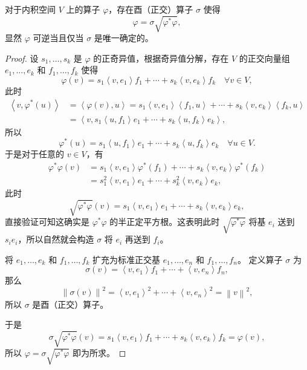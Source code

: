 \documentclass[fontset=none,zihao=-4]{Notes}
\newcommand{\inn}[1]{\left\langle#1\right\rangle}
\newcommand{\norm}[1]{\left\lVert#1\right\rVert}
\begin{document}
\begin{theorem}[线性映射的极分解]\label{thm:polar decoposition of map}
  对于内积空间 $V$ 上的算子 $\varphi$，存在酉（正交）算子 $\sigma$ 使得
  \[
    \varphi=\sigma\sqrt{\varphi^*\varphi},  
  \]
  显然 $\varphi$ 可逆当且仅当 $\sigma$ 是唯一确定的。
\end{theorem}
\begin{proof}
  设 $s_1,\dots,s_k$ 是 $\varphi$ 的正奇异值，根据奇异值分解，存在
  $V$ 的正交向量组 $e_1,\dots,e_k$ 和 $f_1,\dots,f_k$ 使得
  \[
    \varphi(v)=s_1\inn{v,e_1}f_1+\cdots+s_k\inn{v,e_k}f_k\quad \forall v\in V,  
  \]
  此时
  \begin{align*}
    \inn{v,\varphi^*(u)}&=\inn{\varphi(v),u}=
    s_1\inn{v,e_1}\inn{f_1,u}+\cdots+s_k\inn{v,e_k}\inn{f_k,u}\\
    &= \inn{v,s_1\inn{u,f_1}e_1+\cdots+s_k\inn{u,f_k}e_k},
  \end{align*}
  所以
  \[
    \varphi^*(u)=  s_1\inn{u,f_1}e_1+\cdots+s_k\inn{u,f_k}e_k\quad \forall u\in V.
  \]
  于是对于任意的 $v\in V$，有
  \begin{align*}
    \varphi^*\varphi(v)&=s_1\inn{v,e_1}\varphi^*(f_1)+\cdots+s_k\inn{v,e_k}\varphi^*(f_k)\\
    &=s_1^2\inn{v,e_1}e_1+\cdots+s_k^2\inn{v,e_k}e_k,
  \end{align*}
  此时
  \[
    \sqrt{\varphi^*\varphi}(v)=s_1\inn{v,e_1}e_1+\cdots+s_k\inn{v,e_k}e_k,
  \]
  直接验证可知这确实是 $\varphi^*\varphi$ 的半正定平方根。这表明此时
  $\sqrt{\varphi^*\varphi}$ 将基 $e_i$ 送到 $s_ie_i$，所以自然就会构造
  $\sigma$ 将 $e_i$ 再送到 $f_i$。

  将 $e_1,\dots,e_k$ 和 $f_1,\dots,f_k$ 扩充为标准正交基 $e_1,\dots,e_n$
  和 $f_1,\dots,f_n$。
  定义算子 $\sigma$ 为
  \[
    \sigma(v)=\inn{v,e_1}f_1+\cdots+\inn{v,e_n}f_n,  
  \]
  那么
  \[
    \norm{\sigma(v)}^2=\inn{v,e_1}^2+\cdots+\inn{v,e_n}^2=\norm{v}^2,
  \]
  所以 $\sigma$ 是酉（正交）算子。

  于是
  \[
    \sigma\sqrt{\varphi^*\varphi}(v)=s_1\inn{v,e_1}f_1+\cdots+s_k\inn{v,e_k}f_k=\varphi(v),
  \]
  所以 $\varphi=\sigma\sqrt{\varphi^*\varphi}$ 即为所求。
\end{proof}
\end{document}

